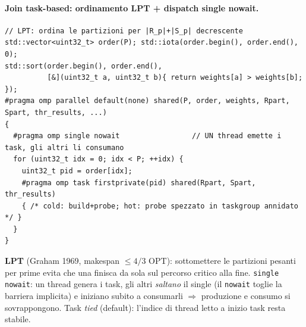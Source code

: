 \documentclass[11pt,a4paper]{article}
\begin{document}
\paragraph{Join task-based: ordinamento LPT + dispatch single nowait.}
\begin{lstlisting}[style=cpp]
// LPT: ordina le partizioni per |R_p|+|S_p| decrescente
std::vector<uint32_t> order(P); std::iota(order.begin(), order.end(), 0);
std::sort(order.begin(), order.end(),
          [&](uint32_t a, uint32_t b){ return weights[a] > weights[b]; });
#pragma omp parallel default(none) shared(P, order, weights, Rpart, Spart, thr_results, ...)
{
  #pragma omp single nowait                 // UN thread emette i task, gli altri li consumano
  for (uint32_t idx = 0; idx < P; ++idx) {
    uint32_t pid = order[idx];
    #pragma omp task firstprivate(pid) shared(Rpart, Spart, thr_results)
    { /* cold: build+probe; hot: probe spezzato in taskgroup annidato */ }
  }
}
\end{lstlisting}
\begin{whybox}
\textbf{LPT} (Graham 1969, makespan $\le 4/3$ OPT): sottomettere le partizioni pesanti per prime evita che una finisca da sola sul percorso critico alla fine. \texttt{single nowait}: un thread genera i task, gli altri \emph{saltano} il single (il \texttt{nowait} toglie la barriera implicita) e iniziano subito a consumarli $\Rightarrow$ produzione e consumo si sovrappongono. Task \emph{tied} (default): l'indice di thread letto a inizio task resta stabile.
\end{whybox}
\end{document}
